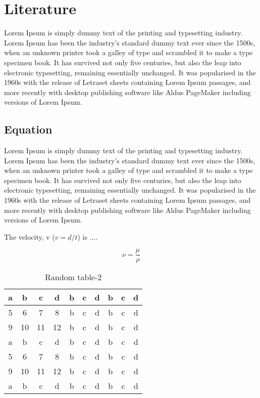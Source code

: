 \chapter{Literature}\label{ch:ch2}
Lorem Ipsum is simply dummy text of the printing and typesetting industry. 
Lorem Ipsum has been the industry's standard dummy text ever since the 1500s, 
when an unknown printer took a galley of type and scrambled it to make a type 
specimen book. It has survived not only five centuries, but also the leap into 
electronic typesetting, remaining essentially unchanged\cite{Prjibelski2018}. 
It was popularised in 
the 1960s with the release of Letraset sheets containing Lorem Ipsum passages, 
and more recently with desktop publishing software like Aldus PageMaker 
including versions of Lorem Ipsum.

\section{Equation}
Lorem Ipsum is simply dummy text of the printing and typesetting industry. 
Lorem Ipsum has been the industry's standard dummy text ever since the 1500s, 
when an unknown printer took a galley of type and scrambled it to make a type 
specimen book. It has survived not only five centuries, but also the leap into 
electronic typesetting, remaining essentially unchanged. It was popularised in 
the 1960s with the release of Letraset sheets containing Lorem Ipsum passages, 
and more recently with desktop publishing software like Aldus PageMaker 
including versions of Lorem Ipsum.\cite{Land2015} 

The velocity, v ($v=d/t$) is ....

\begin{equation}
\nu = \frac{\mu}{\rho}
\end{equation}

\begin{table}
\centering
\caption{Random table-2}
\label{tab:sample2}
\begin{tabular}{|c|c|c|c|c|c|c|c|c|c|}
\hline 
a & b & c & d & b & c & d & b & c & d \\ \hline 
5 & 6 & 7 & 8 & b & c & d & b & c & d\\ \hline 
9 & 10 & 11 & 12 & b & c & d & b & c & d \\ \hline 
a & b & c & d & b & c & d & b & c & d\\ \hline 
5 & 6 & 7 & 8 & b & c & d & b & c & d\\ \hline 
9 & 10 & 11 & 12 & b & c & d & b & c & d \\ \hline 
a & b & c & d & b & c & d & b & c & d\\ \hline 
\end{tabular} 
\end{table}          